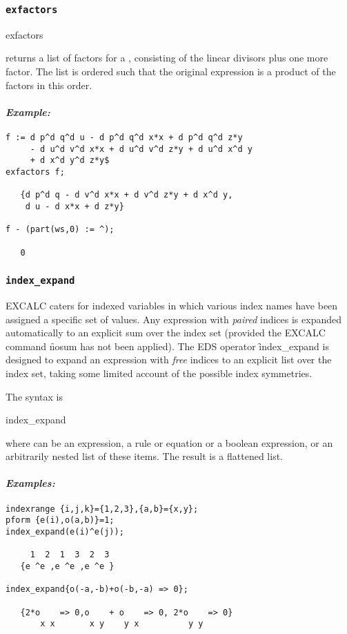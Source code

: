 \subsubsection{\tt exfactors}
\label{exfactors}
\begin{edssyntax}
	exfactors 
\end{edssyntax}
returns a list of factors for a , consisting of the linear
divisors plus one more factor. The list is ordered such that the original
expression is a product of the factors in this order.

\paragraph{\it Example:}
\begin{verbatim}
f := d p^d q^d u - d p^d q^d x*x + d p^d q^d z*y
     - d u^d v^d x*x + d u^d v^d z*y + d u^d x^d y
     + d x^d y^d z*y$
exfactors f;

   {d p^d q - d v^d x*x + d v^d z*y + d x^d y, 
    d u - d x*x + d z*y} 

f - (part(ws,0) := ^);

   0
\end{verbatim}

\subsubsection{\tt index\_expand}
\label{index_expand}

EXCALC caters for indexed variables in which various index names have been
assigned a specific set of values. Any expression with {\em paired} indices
is expanded automatically to an explicit sum over the index set (provided
the EXCALC command \f{nosum} has not been applied). The EDS operator
\f{index\_expand} is designed to expand an expression with {\em free}
indices to an explicit list over the index set, taking some limited account
of the possible index symmetries.

The syntax is
\begin{edssyntax}
	index\_expand 
\end{edssyntax}
where  can be an expression, a rule or equation or a boolean
expression, or an arbitrarily nested list of these items. The result is a
flattened list.

\paragraph{\it Examples:}
\begin{verbatim}
indexrange {i,j,k}={1,2,3},{a,b}={x,y};
pform {e(i),o(a,b)}=1;
index_expand(e(i)^e(j));

     1  2  1  3  2  3
   {e ^e ,e ^e ,e ^e }

index_expand{o(-a,-b)+o(-b,-a) => 0};

   {2*o    => 0,o    + o    => 0, 2*o    => 0}
       x x       x y    y x          y y 
\end{verbatim}


